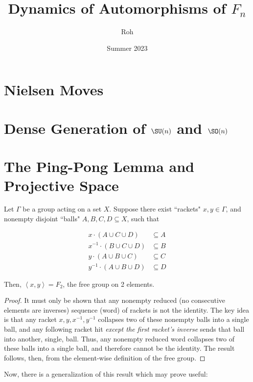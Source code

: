 \documentclass[12pt]{article}
\title{Dynamics of Automorphisms of $F_n$}
\author{Roh}
\date{Summer 2023}
\begin{document}
\maketitle
\tableofcontents

\section{Nielsen Moves}
\section{Dense Generation of $\SU(n)$ and $\SO(n)$}
\section{The Ping-Pong Lemma and Projective Space}

\begin{lemma}\label{lem:the_ping_pong_lemma}
    Let $\Gamma$ be a group acting on a set $X$.
    Suppose there exist ``rackets" $x,y \in \Gamma$, and nonempty disjoint ``balls" $A,B,C,D \subseteq X$, such that

    \begin{align*}
        x \cdot (A \cup C \cup D)      & \subseteq A \\
        x^{-1} \cdot (B \cup C \cup D) & \subseteq B \\
        y \cdot (A \cup B \cup C)      & \subseteq C \\
        y^{-1} \cdot (A \cup B \cup D) & \subseteq D
    \end{align*}

    Then, $\left<x,y\right> = F_2$, the free group on 2 elements.
\end{lemma}
\begin{proof}
    It must only be shown that any nonempty reduced (no consecutive elements are inverses) sequence (word) of rackets is not the identity.
    The key idea is that any racket $x,y,x^{-1},y^{-1}$ collapses two of these nonempty balls into a single ball, and any following racket hit \emph{except the first racket's inverse} sends that ball into another, single, ball.
    Thus, any nonempty reduced word collapses two of these balls into a single ball, and therefore cannot be the identity.
    The \color{rsltnText} result follows, then, from the element-wise definition of the free group.
\end{proof}

Now, there is a generalization of this result which may prove useful:
\end{document}

